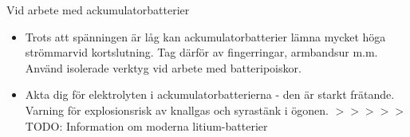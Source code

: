 Vid arbete med ackumulatorbatterier
\begin{itemize}
\item Trots att spänningen är låg kan ackumulatorbatterier lämna
  mycket höga strömmarvid kortslutning. Tag därför av fingerringar,
  armbandsur m.m. Använd isolerade verktyg vid arbete med
  batteripoiskor.
\item Akta dig för elektrolyten i ackumulatorbatterierna - den är
  starkt frätande.  Varning för explosionsrisk av knallgas och
  syrastänk i ögonen.
$>>>>>$ TODO: Information om moderna litium-batterier
\end{itemize}
